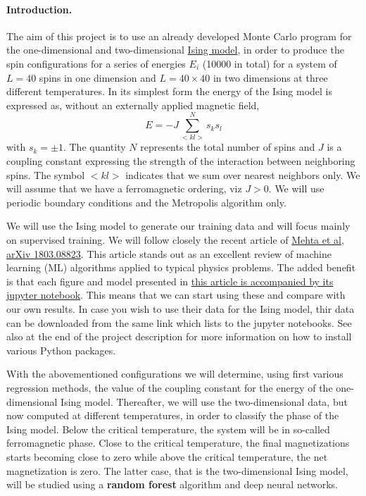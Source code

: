 \documentclass[%
oneside,                 %
final,                   %
10pt]{article}
\begin{document}
\paragraph{Introduction.}
The aim of this project is to use an already developed Monte Carlo program for the one-dimensional and two-dimensional \href{{https://github.com/CompPhysics/MachineLearning/tree/master/doc/Programs/IsingModel}}{Ising model}, in order to produce the spin configurations for a series of energies $E_i$ (10000 in total) for a system of $L=40$ spins in one dimension and $L=40\times 40$ in two dimensions at three different temperatures.
In its simplest form
the energy of the Ising model is expressed as, without an externally applied magnetic field, 
\[
E=-J\sum_{< kl >}^{N}s_ks_l 
\]
with
$s_k=\pm 1$. The quantity $N$ represents the total number of spins and $J$ is a coupling
constant expressing the strength of the interaction between
neighboring spins.  The symbol $<kl>$ indicates that we sum over
nearest neighbors only. We will assume that we have a ferromagnetic
ordering, viz $J> 0$.  We will use periodic boundary conditions and
the Metropolis algorithm only.


We will use the Ising model to generate our training data and will focus mainly on supervised training. We will follow closely the recent article of \href{{https://arxiv.org/abs/1803.08823}}{Mehta et al, arXiv 1803.08823}. This article stands out as an excellent review of machine learning (ML) algorithms applied to typical physics problems. The added benefit is that each figure and model presented in \href{{https://physics.bu.edu/~pankajm/MLnotebooks.html}}{this article is accompanied by its jupyter notebook}. This means that we can start using these and compare with our own results. In case you wish to use their data for the Ising model, thir data can be downloaded from the same link which lists to the jupyter notebooks. See also at the end of the project description for more information on how to install various Python packages. 



With the abovementioned  configurations we will determine, using first various
regression methods, the value of the coupling constant for the energy
of the one-dimensional Ising model. Thereafter, we will use the
two-dimensional data, but now computed at different temperatures, in
order to classify the phase of the Ising model. Below the critical
temperature, the system will be in so-called ferromagnetic
phase. Close to the critical temperature, the final magnetizations
starts becoming close to zero while above the critical temperature,
the net magnetization is zero.  The latter case, that is the
two-dimensional Ising model, will be studied using a \textbf{random forest}
algorithm and deep neural networks.
\end{document}
